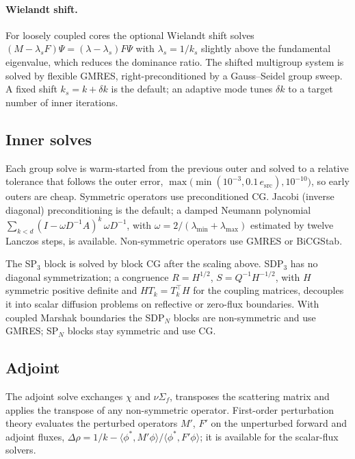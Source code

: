 \documentclass[a4paper,10pt]{article}
\begin{document}
\paragraph{Wielandt shift.} For loosely coupled cores the optional Wielandt shift
solves $(M - \lambda_sF)\Psi = (\lambda - \lambda_s)F\Psi$ with $\lambda_s = 1/k_s$
slightly above the fundamental eigenvalue, which reduces the dominance ratio. The
shifted multigroup system is solved by flexible GMRES, right-preconditioned by a
Gauss--Seidel group sweep. A fixed shift $k_s = k + \delta k$ is the default;
an adaptive mode tunes $\delta k$ to a target number of inner iterations.

\subsection{Inner solves}
\label{sec:inner}

Each group solve is warm-started from the previous outer and solved to a relative
tolerance that follows the outer error,
$\max\bigl(\min(10^{-3}, 0.1\,e_\mathrm{src}), 10^{-10}\bigr)$, so early outers
are cheap. Symmetric operators use preconditioned CG. Jacobi (inverse diagonal)
preconditioning is the default; a damped Neumann polynomial
$\sum_{k<d}(I-\omega D^{-1}A)^k\,\omega D^{-1}$, with $\omega = 2/(\lambda_\mathrm{min}
+ \lambda_\mathrm{max})$ estimated by twelve Lanczos steps, is available.
Non-symmetric operators use GMRES or BiCGStab.

The SP$_3$ block is solved by block CG after the scaling above. SDP$_3$ has no
diagonal symmetrization; a congruence $R = H^{1/2}$, $S = Q^{-1}H^{-1/2}$, with
$H$ symmetric positive definite and $HT_k = T_k^\top H$ for the coupling
matrices, decouples it into scalar diffusion problems on reflective or zero-flux
boundaries. With coupled Marshak boundaries the SDP$_N$ blocks are
non-symmetric and use GMRES; SP$_N$ blocks stay symmetric and use CG.

\subsection{Adjoint}

The adjoint solve exchanges $\chi$ and $\nu\Sigma_f$, transposes the
scattering matrix and applies the transpose of any non-symmetric operator.
First-order perturbation theory evaluates the perturbed operators $M'$, $F'$ on
the unperturbed forward and adjoint fluxes, $\Delta\rho = 1/k -
\langle\phi^*, M'\phi\rangle/\langle\phi^*, F'\phi\rangle$; it is available for the
scalar-flux solvers.
\end{document}
